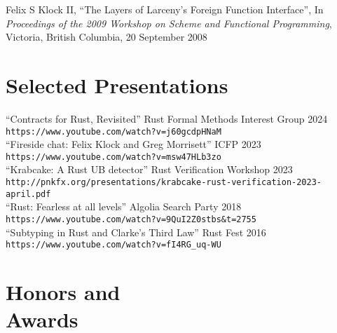 \documentclass[margin,line,draft]{res}
\newcommand{\mysidestyle}{\sc}
\begin{document}
\begin{resume}
\vspace{-2mm}

    Felix S Klock II, ``The Layers of Larceny's Foreign Function Interface'', 
    In \textsl{Proceedings of the 2009 Workshop on Scheme and Functional Programming}, Victoria, British Columbia, 20 September 2008

    \section{\mysidestyle Selected Presentations}
    ``Contracts for Rust, Revisited'' Rust Formal Methods Interest Group 2024\\ {\small\verb|https://www.youtube.com/watch?v=j60gcdpHNaM|}\\
    ``Fireside chat: Felix Klock and Greg Morrisett'' ICFP 2023\\ {\small\verb|https://www.youtube.com/watch?v=msw47HLb3zo|}\\
    ``Krabcake: A Rust UB detector'' Rust Verification Workshop 2023\\ {\small\verb|http://pnkfx.org/presentations/krabcake-rust-verification-2023-april.pdf|}\\
    ``Rust: Fearless at all levels'' Algolia Search Party 2018\\ {\small\verb|https://www.youtube.com/watch?v=9QuI2Z0stbs&t=2755|}\\
    ``Subtyping in Rust and Clarke's Third Law'' Rust Fest 2016\\ {\small\verb|https://www.youtube.com/watch?v=fI4RG_uq-WU|}\\
    \section{\mysidestyle Honors and\\Awards} 


\end{resume}
\end{document}
